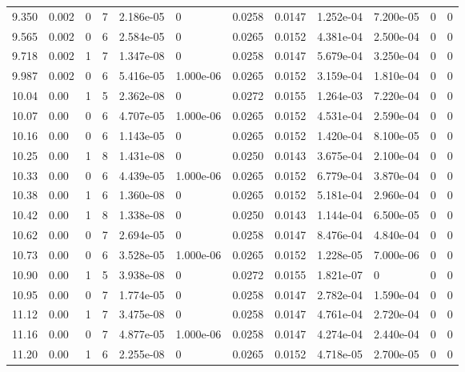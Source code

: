 \documentclass[preview]{standalone}
\begin{document}
{{{\begin{tabular}{L{1.2cm}C{1.2cm} C{0.3cm}C{0.5cm} C{1.4cm}C{1.4cm} C{1.4cm}C{1.4cm} C{1.6cm}C{1.6cm} C{1.6cm}C{1.6cm}}
  9.350  &  0.002  & 0     &  7 &  2.186e-05  & 0  &  0.0258&   0.0147& 1.252e-04 & 7.200e-05   &  0 & 0  \\ 
  9.565  &  0.002  & 0     &  6 &  2.584e-05  & 0  &  0.0265&   0.0152& 4.381e-04 & 2.500e-04   &  0 & 0  \\ 
  9.718  &  0.002  & 1     &  7 &  1.347e-08  & 0  &  0.0258&   0.0147& 5.679e-04 & 3.250e-04   &  0 & 0  \\ 
  9.987  &  0.002  & 0     &  6 &  5.416e-05  & 1.000e-06  &  0.0265&   0.0152& 3.159e-04 & 1.810e-04   &  0 & 0  \\ 
  10.04  &  0.00  & 1     &  5 &  2.362e-08  & 0  &  0.0272&   0.0155& 1.264e-03 & 7.220e-04   &  0 & 0  \\ 
  10.07  &  0.00  & 0     &  6 &  4.707e-05  & 1.000e-06  &  0.0265&   0.0152& 4.531e-04 & 2.590e-04   &  0 & 0  \\ 
  10.16  &  0.00  & 0     &  6 &  1.143e-05  & 0  &  0.0265&   0.0152& 1.420e-04 & 8.100e-05   &  0 & 0  \\ 
  10.25  &  0.00  & 1     &  8 &  1.431e-08  & 0  &  0.0250&   0.0143& 3.675e-04 & 2.100e-04   &  0 & 0  \\ 
  10.33  &  0.00  & 0     &  6 &  4.439e-05  & 1.000e-06  &  0.0265&   0.0152& 6.779e-04 & 3.870e-04   &  0 & 0  \\ 
  10.38  &  0.00  & 1     &  6 &  1.360e-08  & 0  &  0.0265&   0.0152& 5.181e-04 & 2.960e-04   &  0 & 0  \\ 
  10.42  &  0.00  & 1     &  8 &  1.338e-08  & 0  &  0.0250&   0.0143& 1.144e-04 & 6.500e-05   &  0 & 0  \\ 
  10.62  &  0.00  & 0     &  7 &  2.694e-05  & 0  &  0.0258&   0.0147& 8.476e-04 & 4.840e-04   &  0 & 0  \\ 
  10.73  &  0.00  & 0     &  6 &  3.528e-05  & 1.000e-06  &  0.0265&   0.0152& 1.228e-05 & 7.000e-06   &  0 & 0  \\ 
  10.90  &  0.00  & 1     &  5 &  3.938e-08  & 0  &  0.0272&   0.0155& 1.821e-07 & 0   &  0 & 0  \\ 
  10.95  &  0.00  & 0     &  7 &  1.774e-05  & 0  &  0.0258&   0.0147& 2.782e-04 & 1.590e-04   &  0 & 0  \\ 
  11.12  &  0.00  & 1     &  7 &  3.475e-08  & 0  &  0.0258&   0.0147& 4.761e-04 & 2.720e-04   &  0 & 0  \\ 
  11.16  &  0.00  & 0     &  7 &  4.877e-05  & 1.000e-06  &  0.0258&   0.0147& 4.274e-04 & 2.440e-04   &  0 & 0  \\ 
  11.20  &  0.00  & 1     &  6 &  2.255e-08  & 0  &  0.0265&   0.0152& 4.718e-05 & 2.700e-05   &  0 & 0  \\ 

\end{tabular}}}}
\end{document}
